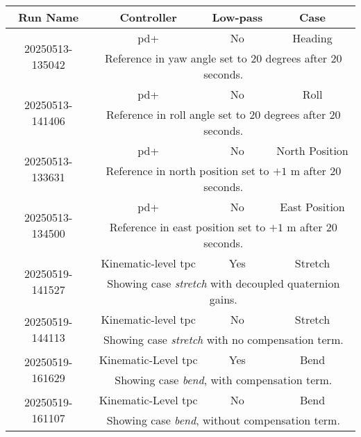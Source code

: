 \begin{table}[!ht]
    \centering
    \begin{tabular}{|c|c|c|c|}
        \hline
        Run Name & Controller & Low-pass & Case \\ \hline \hline
        \multirow{2}{*}{20250513-135042} & \gls{pd+} & No & Heading \\ \cline{2-4}
        & \multicolumn{3}{p{0.75\linewidth}|}{Reference in yaw angle set to \(20\) degrees after 20 seconds.} \\ \hline
        \multirow{2}{*}{20250513-141406} & \gls{pd+} & No & Roll \\ \cline{2-4}
        & \multicolumn{3}{p{0.75\linewidth}|}{Reference in roll angle set to \(20\) degrees after 20 seconds.} \\ \hline
        \multirow{2}{*}{20250513-133631} & \gls{pd+} & No & North Position \\ \cline{2-4}
        & \multicolumn{3}{p{0.75\linewidth}|}{Reference in north position set to \(+1\) m after 20 seconds.} \\ \hline
        \multirow{2}{*}{20250513-134500} & \gls{pd+} & No & East Position \\ \cline{2-4}
        & \multicolumn{3}{p{0.75\linewidth}|}{Reference in east position set to \(+1\) m after 20 seconds.} \\ \hline
        \hline
        \multirow{2}{*}{20250519-141527} & Kinematic-level \gls{tpc} & Yes & Stretch \\ \cline{2-4}
        & \multicolumn{3}{p{0.75\linewidth}|}{Showing case \textit{stretch} with decoupled quaternion gains.} \\ \hline
        \multirow{2}{*}{20250519-144113} & Kinematic-level \gls{tpc} & No & Stretch \\ \cline{2-4}
        & \multicolumn{3}{p{0.75\linewidth}|}{Showing case \textit{stretch} with no compensation term.} \\ \hline
        \hline
        \multirow{2}{*}{20250519-161629} & Kinematic-Level \gls{tpc} & Yes & Bend \\ \cline{2-4}
        & \multicolumn{3}{p{0.75\linewidth}|}{Showing case \textit{bend}, with compensation term.} \\ \hline
        \multirow{2}{*}{20250519-161107} & Kinematic-Level \gls{tpc} & No & Bend \\ \cline{2-4}
        & \multicolumn{3}{p{0.75\linewidth}|}{Showing case \textit{bend}, without compensation term.} \\ \hline

\end{tabular}
\end{table}
